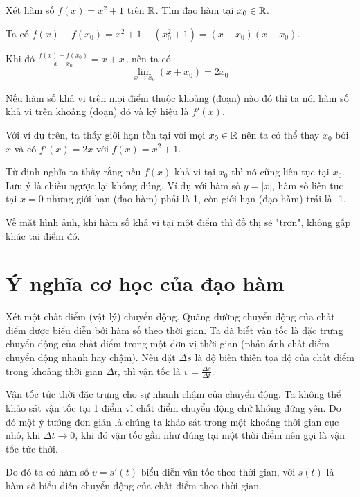 \begin{example}
    Xét hàm số $f(x) = x^2 + 1$ trên $\mathbb{R}$. Tìm đạo hàm tại $x_0 \in \mathbb{R}$.

    Ta có $f(x)-f(x_0) = x^2 + 1 - (x_0^2 + 1) = (x - x_0) (x + x_0)$.

    Khi đó $\frac{f(x)-f(x_0)}{x-x_0} = x + x_0$ nên ta có
    \[ \lim_{x \to x_0} (x + x_0) = 2 x_0 \]
\end{example}

Nếu hàm số khả vi trên mọi điểm thuộc khoảng (đoạn) nào đó thì
ta nói hàm số khả vi trên khoảng (đoạn) đó và ký hiệu là $f'(x)$.

Với ví dụ trên, ta thấy giới hạn tồn tại với mọi $x_0 \in \mathbb{R}$ nên ta có thể
thay $x_0$ bởi $x$ và có $f'(x) = 2x$ với $f(x) = x^2 + 1$.

\begin{remark}
    Từ định nghĩa ta thấy rằng nếu $f(x)$ khả vi tại $x_0$ thì nó cũng liên tục tại $x_0$.
    Lưu ý là chiều ngược lại không đúng. Ví dụ với hàm số $y = \lvert x \rvert$, 
    hàm số liên tục tại $x=0$ nhưng giới hạn (đạo hàm) phải là 1, 
    còn giới hạn (đạo hàm) trái là -1.
\end{remark}

Về mặt hình ảnh, khi hàm số khả vi tại một điểm thì đồ thị sẽ "trơn",
không gấp khúc tại điểm đó.

\section{Ý nghĩa cơ học của đạo hàm}

Xét một chất điểm (vật lý) chuyển động. Quãng đường chuyển động của chất điểm được 
biểu diễn bởi hàm số theo thời gian. Ta đã biết vận tốc là đặc trưng chuyển động của 
chất điểm trong một đơn vị thời gian (phản ánh chất điểm chuyển động nhanh hay chậm).
Nếu đặt $\Delta s$ là độ biến thiên tọa độ của chất điểm trong khoảng thời gian $\Delta t$,
thì vận tốc là $v = \frac{\Delta s}{\Delta t}$.

Vận tốc tức thời đặc trưng cho sự nhanh chậm của chuyển động.
Ta không thể khảo sát vận tốc tại 1 điểm vì chất điểm chuyển động
chứ không đứng yên. Do đó một ý tưởng đơn giản là chúng ta khảo sát
trong một khoảng thời gian cực nhỏ, khi $\Delta t \to 0$, khi đó
vận tốc gần như đúng tại một thời điểm nên gọi là vận tốc tức thời.

Do đó ta có hàm số $v = s'(t)$ biểu diễn vận tốc theo thời gian, 
với $s(t)$ là hàm số biểu diễn chuyển động của chất điểm theo thời gian.

